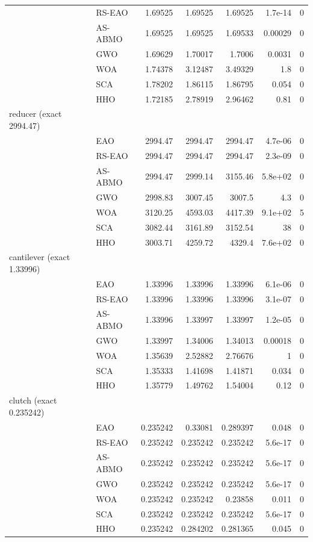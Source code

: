\begin{tabular}{@{}llrrrrr@{}}
 & RS-EAO & 1.69525 & 1.69525 & 1.69525 & 1.7e-14 & 0 \\
 & AS-ABMO & 1.69525 & 1.69525 & 1.69533 & 0.00029 & 0 \\
 & GWO & 1.69629 & 1.70017 & 1.7006 & 0.0031 & 0 \\
 & WOA & 1.74378 & 3.12487 & 3.49329 & 1.8 & 0 \\
 & SCA & 1.78202 & 1.86115 & 1.86795 & 0.054 & 0 \\
 & HHO & 1.72185 & 2.78919 & 2.96462 & 0.81 & 0 \\
reducer (exact 2994.47) & & & & & & \\
 & EAO & 2994.47 & 2994.47 & 2994.47 & 4.7e-06 & 0 \\
 & RS-EAO & 2994.47 & 2994.47 & 2994.47 & 2.3e-09 & 0 \\
 & AS-ABMO & 2994.47 & 2999.14 & 3155.46 & 5.8e+02 & 0 \\
 & GWO & 2998.83 & 3007.45 & 3007.5 & 4.3 & 0 \\
 & WOA & 3120.25 & 4593.03 & 4417.39 & 9.1e+02 & 5 \\
 & SCA & 3082.44 & 3161.89 & 3152.54 & 38 & 0 \\
 & HHO & 3003.71 & 4259.72 & 4329.4 & 7.6e+02 & 0 \\
cantilever (exact 1.33996) & & & & & & \\
 & EAO & 1.33996 & 1.33996 & 1.33996 & 6.1e-06 & 0 \\
 & RS-EAO & 1.33996 & 1.33996 & 1.33996 & 3.1e-07 & 0 \\
 & AS-ABMO & 1.33996 & 1.33997 & 1.33997 & 1.2e-05 & 0 \\
 & GWO & 1.33997 & 1.34006 & 1.34013 & 0.00018 & 0 \\
 & WOA & 1.35639 & 2.52882 & 2.76676 & 1 & 0 \\
 & SCA & 1.35333 & 1.41698 & 1.41871 & 0.034 & 0 \\
 & HHO & 1.35779 & 1.49762 & 1.54004 & 0.12 & 0 \\
clutch (exact 0.235242) & & & & & & \\
 & EAO & 0.235242 & 0.33081 & 0.289397 & 0.048 & 0 \\
 & RS-EAO & 0.235242 & 0.235242 & 0.235242 & 5.6e-17 & 0 \\
 & AS-ABMO & 0.235242 & 0.235242 & 0.235242 & 5.6e-17 & 0 \\
 & GWO & 0.235242 & 0.235242 & 0.235242 & 5.6e-17 & 0 \\
 & WOA & 0.235242 & 0.235242 & 0.23858 & 0.011 & 0 \\
 & SCA & 0.235242 & 0.235242 & 0.235242 & 5.6e-17 & 0 \\
 & HHO & 0.235242 & 0.284202 & 0.281365 & 0.045 & 0 \\
\bottomrule
\end{tabular}
